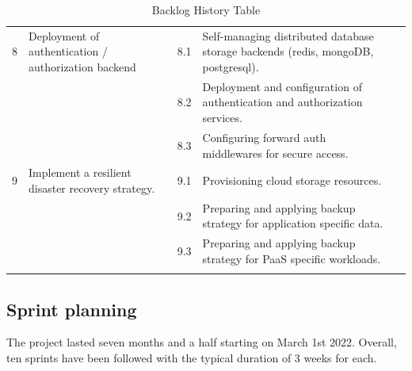 \begin{longtable}[H]{|m{1cm}|m{3cm}|m{1cm}|m{7cm}|m{1.2cm}|}
8 & \raggedright Deployment of authentication / authorization backend 	& 8.1 & \raggedright Self-managing distributed database storage backends (redis, mongoDB, postgresql).	 & \\
\cline{3-5}
&   & 8.2 &	\raggedright Deployment and configuration of authentication and authorization services.	 & \\
\cline{3-5}
&   & 8.3 &	\raggedright Configuring forward auth middlewares for secure access.	 & \\
   \hline
9 & \raggedright Implement a resilient disaster recovery strategy. & 9.1 &\raggedright  Provisioning cloud storage resources.		 & \\
\cline{3-5}
&   & 9.2 & \raggedright Preparing and applying backup strategy for application specific data.	 & \\
\cline{3-5}
&   & 9.3 &	\raggedright Preparing and applying backup strategy for PaaS specific workloads.	 & \\
 \hline
\caption{ Backlog History Table }
\end{longtable}

\subsection{Sprint planning }
The project lasted seven months and a half starting on March 1st 2022. Overall, ten sprints have been followed with the typical duration of 3 weeks for each. 


